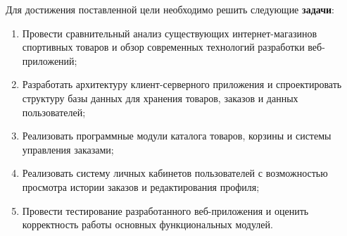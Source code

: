 Для достижения поставленной цели необходимо решить следующие \textbf{задачи}:
\begin{enumerate}
	\item Провести сравнительный анализ существующих интернет-магазинов
          спортивных товаров и обзор современных технологий разработки
          веб-приложений;
    \item Разработать архитектуру клиент-серверного приложения и спроектировать
          структуру базы данных для хранения товаров, заказов и данных
          пользователей;
    \item Реализовать программные модули каталога товаров, корзины и системы
          управления заказами;
    \item Реализовать систему личных кабинетов пользователей с возможностью
          просмотра истории заказов и редактирования профиля;
    \item Провести тестирование разработанного веб-приложения и оценить
          корректность работы основных функциональных модулей.
\end{enumerate}